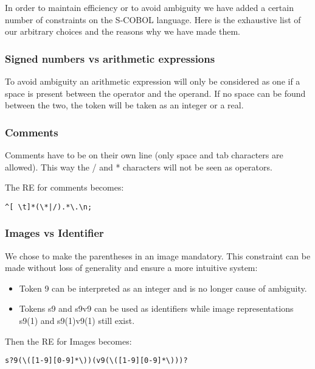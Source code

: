 \documentclass[a4paper,12pt]{article}
\begin{document}
In order to maintain efficiency or to avoid ambiguity we have added a certain number of constraints on the S-COBOL language. Here is the exhaustive list of our arbitrary choices and the reasons why we have made them.

\subsubsection{Signed numbers vs arithmetic expressions}

To avoid ambiguity an arithmetic expression will only be considered as one if a space is present between the operator and the operand. If no space can be found between the two, the token will be taken as an integer or a real.

\subsubsection{Comments}
\label{sec:impl:choices:comments}

Comments have to be on their own line (only space and tab characters are allowed). This way the / and * characters will not be seen as operators.

The RE for comments becomes:

\begin{verbatim}
^[ \t]*(\*|/).*\.\n;
\end{verbatim}

\subsubsection{Images vs Identifier}

We chose to make the parentheses in an image mandatory. This constraint can be made without loss of generality and ensure a more intuitive system:

\begin{itemize}
	\item Token 9 can be interpreted as an integer and is no longer cause of ambiguity.
	\item Tokens s9 and s9v9 can be used as identifiers while image representations s9(1) and s9(1)v9(1) still exist.  
\end{itemize}

Then the RE for Images becomes:

\begin{verbatim}
s?9(\([1-9][0-9]*\))(v9(\([1-9][0-9]*\)))?
\end{verbatim}
\end{document}
